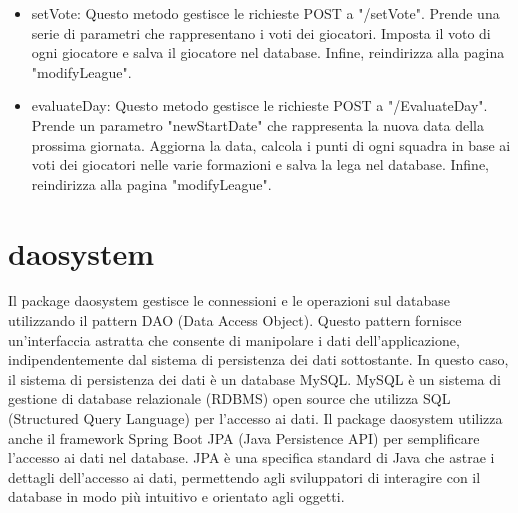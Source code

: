 \documentclass[twoside,openright,titlepage,fleqn,headinclude,12pt,a4paper,BCOR=5mm,footinclude]{scrbook}
\begin{document}
\begin{itemize}
    \item setVote: Questo metodo gestisce le richieste POST a "/setVote". Prende una serie di parametri che rappresentano i voti dei giocatori. Imposta il voto di ogni giocatore e salva il giocatore nel database. Infine, reindirizza alla pagina "modifyLeague". 
    \item evaluateDay: Questo metodo gestisce le richieste POST a "/EvaluateDay". Prende un parametro "newStartDate" che rappresenta la nuova data della prossima giornata. Aggiorna la data, calcola i punti di ogni squadra in base ai voti dei giocatori nelle varie formazioni e salva la lega nel database. Infine, reindirizza alla pagina "modifyLeague".
\end{itemize}

\section{daosystem}
Il package daosystem gestisce le connessioni e le operazioni sul database utilizzando il pattern DAO (Data Access Object). Questo pattern fornisce un'interfaccia astratta che consente di manipolare i dati dell'applicazione, indipendentemente dal sistema di persistenza dei dati sottostante. In questo caso, il sistema di persistenza dei dati è un database MySQL. MySQL è un sistema di gestione di database relazionale (RDBMS) open source che utilizza SQL (Structured Query Language) per l'accesso ai dati.  Il package daosystem utilizza anche il framework Spring Boot JPA (Java Persistence API) per semplificare l'accesso ai dati nel database. JPA è una specifica standard di Java che astrae i dettagli dell'accesso ai dati, permettendo agli sviluppatori di interagire con il database in modo più intuitivo e orientato agli oggetti.
\end{document}
